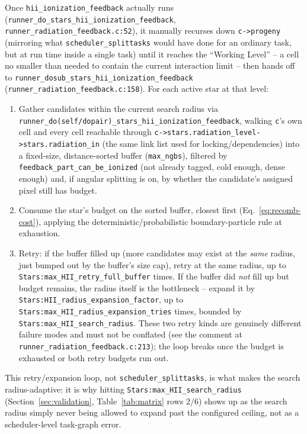 Once \texttt{hii\_ionization\_feedback} actually runs
(\texttt{runner\_do\_stars\_hii\_ionization\_feedback},
\texttt{runner\_radiation\_feedback.c:52}), it manually recurses down
\texttt{c->progeny} (mirroring what \texttt{scheduler\_splittasks}
would have done for an ordinary task, but at run time inside a single
task) until it reaches the ``Working Level'' -- a cell no smaller than
needed to contain the current interaction limit -- then hands off to
\texttt{runner\_dosub\_stars\_hii\_ionization\_feedback}
(\texttt{runner\_radiation\_feedback.c:158}). For each active star at
that level:
\begin{enumerate}
  \item Gather candidates within the current search radius via
    \texttt{runner\_do(self/dopair)\_stars\_hii\_ionization\_feedback},
    walking \texttt{c}'s own cell and every cell reachable through
    \texttt{c->stars.radiation\_level->stars.radiation\_in} (the same
    link list used for locking/dependencies) into a fixed-size,
    distance-sorted buffer (\texttt{max\_ngbs}), filtered by
    \texttt{feedback\_part\_can\_be\_ionized} (not already tagged, cold
    enough, dense enough) and, if angular splitting is on, by whether
    the candidate's assigned pixel still has budget.
  \item Consume the star's budget on the sorted buffer, closest first
    (Eq.~\ref{eq:recomb-cost}), applying the deterministic/probabilistic
    boundary-particle rule at exhaustion.
  \item Retry: if the buffer filled up (more candidates may exist at
    the \emph{same} radius, just bumped out by the buffer's size cap),
    retry at the same radius, up to
    \texttt{Stars:max\_HII\_retry\_full\_buffer} times. If the buffer
    did \emph{not} fill up but budget remains, the radius itself is
    the bottleneck -- expand it by
    \texttt{Stars:HII\_radius\_expansion\_factor}, up to
    \texttt{Stars:max\_HII\_radius\_expansion\_tries} times, bounded by
    \texttt{Stars:max\_HII\_search\_radius}. These two retry kinds are
    genuinely different failure modes and must not be conflated (see
    the comment at \texttt{runner\_radiation\_feedback.c:213}); the
    loop breaks once the budget is exhausted or both retry budgets run
    out.
\end{enumerate}
This retry/expansion loop, not \texttt{scheduler\_splittasks}, is what
makes the search radius-adaptive: it is why hitting
\texttt{Stars:max\_HII\_search\_radius} (Section~\ref{sec:validation},
Table~\ref{tab:matrix} rows 2/6) shows up as the search radius simply
never being allowed to expand past the configured ceiling, not as a
scheduler-level task-graph error.

